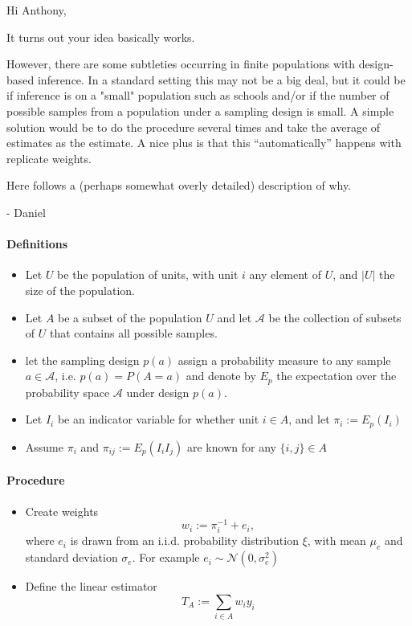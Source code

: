 \documentclass{article}
\begin{document}
Hi Anthony,

It turns out your idea basically works. 

However, there are some subtleties occurring in finite populations with design-based inference. In a standard setting this may not be a big deal, but it could be if inference is on a "small" population such as schools and/or if the number of possible samples from a population under a sampling design is small. A simple solution would be to do the procedure several times and take the average of estimates as the estimate. A nice plus is that this ``automatically'' happens with replicate weights. 

Here follows a (perhaps somewhat overly detailed) description of why.

- Daniel

\paragraph{Definitions}


\begin{itemize}
	\item Let $U$ be the population of units, with unit $i$ any element of $U$, and $|U|$ the size of the population.
	\item Let $A$ be a subset of the population $U$ and let $\mathcal{A}$ be the collection of subsets of $U$ that contains all possible samples. 
 \item let the sampling design $p(a)$ assign a probability measure to any sample $a \in \mathcal{A}$, i.e. $p(a) = P(A = a)$  and denote by $E_p$ the expectation over the probability space $\mathcal{A}$ under design $p(a)$. 
	\item Let $I_i$ be an indicator variable for whether unit $i \in A$, and let $\pi_i := E_p(I_i)$
	\item Assume $\pi_i$ and $\pi_{ij} := E_p(I_i I_j)$ are known for any $\{i, j\} \in A$
\end{itemize}



\paragraph{Procedure}

\begin{itemize}
	\item Create weights $$w_i := \pi_i^{-1} + e_i,$$ where $e_i$ is drawn from an i.i.d. probability distribution $\xi$, with mean $\mu_e$ and standard deviation $\sigma_e$. For example $e_i \sim \mathcal{N}(0, \sigma_e^2)$
	\item Define the linear estimator $$T_A := \sum_{i \in A} w_i y_i$$
\end{itemize}
\end{document}
